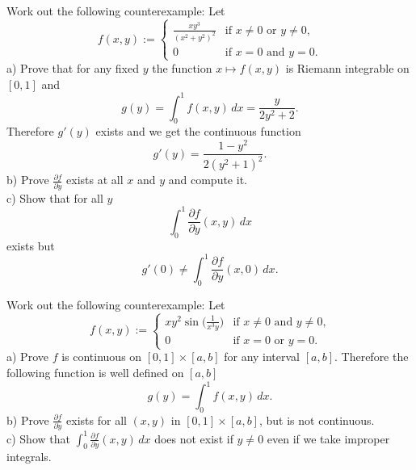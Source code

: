 \begin{exercise}
Work out the following counterexample:  Let
\begin{equation*}
f(x,y) :=
\begin{cases}
\frac{xy^3}{{(x^2+y^2)}^2} & \text{if $x\not=0$ or $y\not= 0$,}\\
0 & \text{if $x=0$ and $y=0$.}
\end{cases}
\end{equation*}
a) Prove that for any fixed $y$ the function $x \mapsto f(x,y)$ is
Riemann integrable on $[0,1]$ and
\begin{equation*}
g(y) = \int_0^1 f(x,y) \, dx = \frac{y}{2y^2+2} .
\end{equation*}
Therefore $g'(y)$ exists and we get the continuous function
\begin{equation*}
g'(y) = \frac{1-y^2}{2{(y^2+1)}^2} .
\end{equation*}
b) Prove $\frac{\partial f}{\partial y}$ exists at all $x$ and $y$ and
compute it.\\
c) Show that for all $y$
\begin{equation*}
\int_0^1 \frac{\partial f}{\partial y} (x,y) \, dx
\end{equation*}
exists but
\begin{equation*}
g'(0) \not= \int_0^1 \frac{\partial f}{\partial y} (x,0) \, dx .
\end{equation*}
\end{exercise}

\begin{exercise}
Work out the following counterexample:  Let
\begin{equation*}
f(x,y) :=
\begin{cases}
xy^2 \sin\bigl(\frac{1}{x^3y}\bigr) & \text{if $x\not=0$ and $y\not= 0$,}\\
0 & \text{if $x=0$ or $y=0$.}
\end{cases}
\end{equation*}
a) Prove $f$ is continuous on $[0,1] \times [a,b]$ for any interval
$[a,b]$. Therefore the following function is well defined on $[a,b]$
\begin{equation*}
g(y) = \int_0^1 f(x,y) \, dx .
\end{equation*}
b) Prove $\frac{\partial f}{\partial y}$ exists for all $(x,y)$ in
$[0,1] \times [a,b]$, but is not continuous.
\\
c) Show that $\int_0^1 \frac{\partial f}{\partial y}(x,y) \, dx$ does not
exist if $y \not= 0$ even if we take improper integrals.
\end{exercise}

